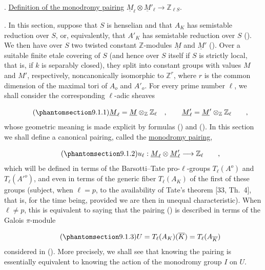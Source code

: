 
\medskip
{}. \underline{Definition of the monodromy pairing}
$\underline{M}_{\ell}\otimes\underline{M}'_{\ell}
 \longrightarrow \mathbb{Z}_{\ell S}$.

\medskip
\noindent
{}. In this section, suppose that $S$ is henselian and that $A_K$
has semistable reduction over $S$, or, equivalently, that $A'_K$
has semistable reduction over $S$ (). We then have over $S$ two
twisted constant $\mathbb{Z}$-modules $\underline{M}$ and
$\underline{M}'$ (). Over a suitable finite etale covering of
$S$ (and hence over $S$ itself if $S$ is strictly local, that is, if
$k$ is separably closed), they split into constant groups with
values $M$ and $M'$, respectively, noncanonically isomorphic to
$\mathbb{Z}^{r}$, where $r$ is the common dimension of the maximal
tori of $A_o$ and $A'_o$. For every prime number $\ell$, we shall
consider the corresponding $\ell$-adic sheaves

\begin{equation}\tag{\SGARefTarget{sga7.sga7i.eix.n9-1-1}{9.1.1}}
\underline{M}_{\ell}=\underline{M}\otimes_{\mathbb{Z}}\mathbb{Z}_{\ell}
 \quad , \qquad
\underline{M}'_{\ell}=\underline{M}'\otimes_{\mathbb{Z}}\mathbb{Z}_{\ell}
 \qquad ,
\end{equation}
whose geometric meaning is made explicit by formulas () and
(). In this section we shall define a canonical pairing, called
the \underline{monodromy pairing},

\begin{equation}\tag{\SGARefTarget{sga7.sga7i.eix.n9-1-2}{9.1.2}}
u_{\ell}:\underline{M}_{\ell}\otimes\underline{M}'_{\ell}
 \longrightarrow\mathbb{Z}_{\ell} \qquad ,
\end{equation}
which will be defined in terms of the Barsotti--Tate pro-$\ell$-groups
$T_{\ell}(A^{o})$ and $T_{\ell}({A'}^{o})$, and even in terms of the
generic fiber $T_{\ell}(A_K)$ of the first of these groups (subject,
when $\ell=p$, to the availability of Tate's theorem [33, Th.~4],
that is, for the time being, provided we are then in unequal
characteristic). When $\ell\neq p$, this is equivalent to saying
that the pairing () is described in terms of the Galois
$\pi$-module

\begin{equation}\tag{\SGARefTarget{sga7.sga7i.eix.n9-1-3}{9.1.3}}
U=T_{\ell}(A_K)(\overline K)=T_{\ell}(A_{\overline K})
\end{equation}
considered in (). More precisely, we shall see that knowing the
pairing is essentially equivalent to knowing the action of the
monodromy group $I$ on $U$.
